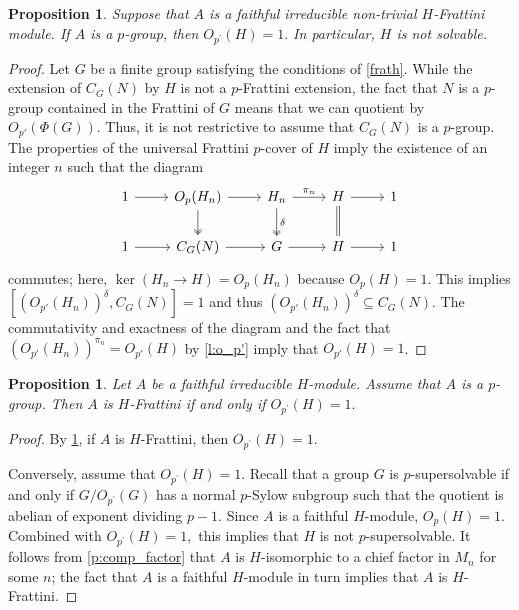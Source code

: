 \documentclass[10pt,a4paper]{amsart}
\newtheorem{proposition}[thm]{Proposition}
\begin{document}
\begin{proposition}\label{p:o_p'_trivial}
    Suppose that $A$ is a faithful irreducible non-trivial $H$-Frattini module. If $A$ is a $p$-group, then $O_{p^\prime}(H)=1.$ In particular, $H$ is not solvable.
\end{proposition}
\begin{proof}
Let $G$ be a finite group satisfying the conditions of \cref{frath}. While the extension of $C_G(N)$ by $H$ is not a $p$-Frattini extension, the fact that $N$ is a $p$-group contained in the Frattini of $G$ means that we can quotient by $O_{p'}(\Phi(G))$. Thus, it is not restrictive to assume that $C_G(N)$ is a $p$-group. The properties of the universal Frattini $p$-cover of $H$ imply the existence of an integer $n$ such that the diagram
\[\begin{tikzcd}
	1 & {O_p(H_n)} & {H_n} & {H} & 1 \\
	1 & C_G(N) & G & {H} & 1
	\arrow[from=1-1, to=1-2]
	\arrow[from=1-2, to=1-3]
	\arrow[two heads, from=1-2, to=2-2]
	\arrow["{\pi_n}",from=1-3, to=1-4]
	\arrow["{\delta}", two heads, from=1-3, to=2-3]
	\arrow[from=1-4, to=1-5]
	\arrow[r,-,double equal sign distance,double, from=1-4, to=2-4]
	\arrow[from=2-1, to=2-2]
	\arrow[from=2-2, to=2-3]
	\arrow[from=2-3, to=2-4]
	\arrow[from=2-4, to=2-5]
\end{tikzcd}\]
commutes; here, $\ker(H_n \to H) = O_p(H_n)$
 because $O_p(H)=1$. This implies $[(O_{p'}(H_n))^\delta,C_G(N)]=1$ and thus $(O_{p'}(H_n))^\delta \subseteq C_G(N)$. The commutativity and exactness of the diagram and the fact that $(O_{p'}(H_n))^{\pi_n}=O_{p'}(H)$ by \cref{l:o_p'} imply that $O_{p'}(H)=1$.
\end{proof}

\begin{proposition}\label{p:frat-mod_o-p'}
Let $A$ be a faithful irreducible $H$-module. Assume that $A$ is a $p$-group. Then $A$ is $H$-Frattini if and only if $O_{p^\prime}(H)=1.$
\end{proposition}
\begin{proof}By \cref{p:o_p'_trivial}, if $A$ is $H$-Frattini, then $O_{p^\prime}(H)=1.$

Conversely, assume that $O_{p^\prime}(H)=1.$ Recall that a group $G$ is $p$-supersolvable if and only if $G/O_{p^\prime}(G)$ has a normal $p$-Sylow subgroup such that the quotient is abelian of exponent dividing $p-1$. Since $A$ is a faithful $H$-module, $O_p(H)=1.$ Combined with $O_{p^\prime}(H)=1,$ this implies that $H$ is not  $p$-supersolvable. It follows from \cref{p:comp_factor} that $A$ is $H$-isomorphic to a chief factor in $M_n$ for some $n$; the fact that $A$ is a faithful $H$-module in turn implies that $A$ is $H$-Frattini.
\end{proof}
\end{document}
